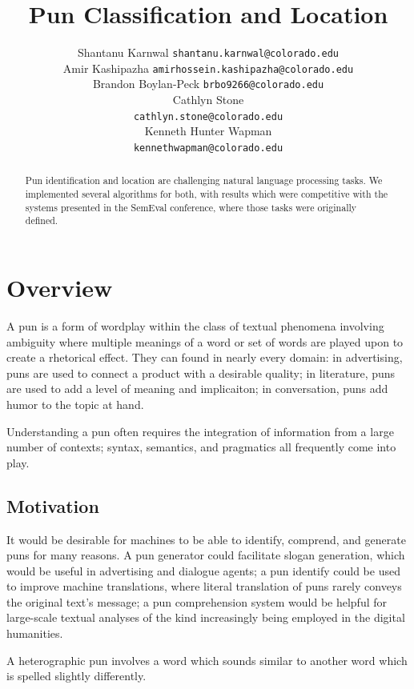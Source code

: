 \documentclass{article}
\title{Pun Classification and Location}
\author{Shantanu Karnwal
	\texttt{shantanu.karnwal@colorado.edu}
	\And\\
	Amir Kashipazha
	\texttt{amirhossein.kashipazha@colorado.edu}
	\And\\
	Brandon Boylan-Peck
	\texttt{brbo9266@colorado.edu}
	\And\\
	Cathlyn Stone\\
	\texttt{cathlyn.stone@colorado.edu}
	\And\\
	Kenneth Hunter Wapman\\
	\texttt{kennethwapman@colorado.edu}
}
\begin{document}
\maketitle

\begin{abstract}
	Pun identification and location are challenging natural language processing 
	tasks. We implemented several algorithms for both, with results which 
	were competitive with the systems presented in the SemEval conference, where
	those tasks were originally defined.
\end{abstract}


\section{Overview}
A pun is a form of wordplay within the class of textual phenomena involving
ambiguity where multiple meanings of a word or set of words are played upon to
create a rhetorical effect. They can found in nearly every domain: in
advertising, puns are used to connect a product with a desirable quality; in
literature, puns are used to add a level of meaning and implicaiton; in
conversation, puns add humor to the topic at hand.

Understanding a pun often requires the integration of information from a large
number of contexts; syntax, semantics, and pragmatics all frequently come into
play. 

\subsection{Motivation}

It would be desirable for machines to be able to identify, comprend, and
generate puns for many reasons. A pun generator could facilitate slogan
generation, which would be useful in advertising and dialogue agents; a pun
identify could be used to improve machine translations, where literal
translation of puns rarely conveys the original text's message; a pun
comprehension system would be helpful for large-scale textual analyses of the
kind increasingly being employed in the digital humanities.

A heterographic pun involves a word which sounds similar to another word which
is spelled slightly differently.
\end{document}
